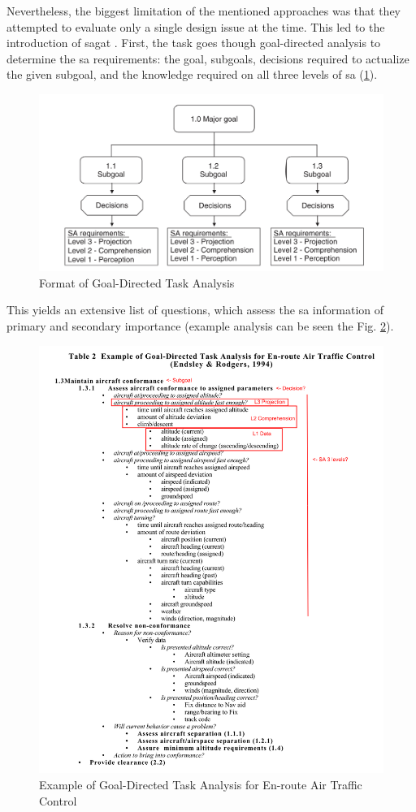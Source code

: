 Nevertheless, the biggest limitation of the mentioned approaches was that they attempted to evaluate only a single design issue at the time. This led \parencite{endsley_situation_1988} to the introduction of \gls{sagat} . First, the task goes though goal-directed analysis to determine the \gls{sa} requirements: the goal, subgoals, decisions required to actualize the given subgoal, and the knowledge required on all three levels of \gls{sa} (\ref{fig:sagoalorientedtaskanalysis}).
\begin{figure}
	\centering
	\includegraphics[width=0.7\linewidth]{figures/placeholders/SA_goal_oriented_task_analysis}
	\caption{Format of Goal-Directed Task Analysis \parencite{endsley_direct_nodate}}
	\label{fig:sagoalorientedtaskanalysis}
\end{figure}
This yields an extensive list of questions, which assess the \gls{sa} information of primary and secondary importance (example analysis can be seen the Fig. \ref{fig:sagoalorientedtaskanalysisresultexample}).
\begin{figure}
	\centering
	\includegraphics[width=0.7\linewidth]{figures/placeholders/SA_goal_oriented_task_analysis_result_example}
	\caption{Example of Goal-Directed Task Analysis for En-route Air Traffic Control \parencite{endsley_direct_nodate}}
	\label{fig:sagoalorientedtaskanalysisresultexample}
\end{figure}
